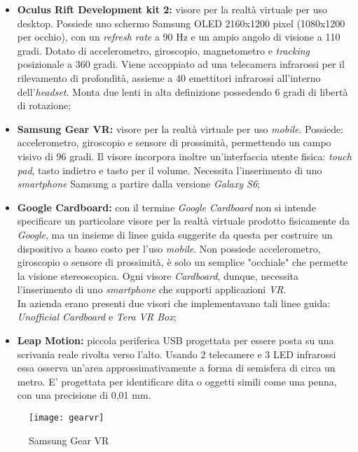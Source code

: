 \begin{itemize}
	\item \textbf{Oculus Rift Development kit 2:} visore per la realtà virtuale per uso desktop. Possiede uno schermo Samsung OLED 2160x1200 pixel (1080x1200 per occhio), con un \textit{refresh rate} a 90 Hz e un ampio angolo di visione a 110 gradi. Dotato di accelerometro, giroscopio, magnetometro e \textit{tracking} posizionale a 360 gradi. Viene accoppiato ad una telecamera infrarossi per il rilevamento di profondità, assieme a 40 emettitori infrarossi all'interno dell'\textit{headset}. Monta due lenti in alta definizione possedendo 6 gradi di libertà di rotazione;
	
	\item \textbf{Samsung Gear VR:} visore per la realtà virtuale per uso \textit{mobile}. Possiede: accelerometro, giroscopio e sensore di prossimità, permettendo un campo visivo di 96 gradi. Il visore incorpora inoltre un'interfaccia utente fisica: \textit{touch pad}, tasto indietro e tasto per il volume. Necessita l'inserimento di uno \textit{smartphone} Samsung a partire dalla versione \textit{Galaxy S6};
	
	\item \textbf{Google Cardboard:} con il termine \textit{Google Cardboard} non si intende specificare un particolare visore per la realtà virtuale prodotto fisicamente da \textit{Google}, ma un insieme di linee guida suggerite da questa per costruire un dispositivo a basso costo per l'uso \textit{mobile}. Non possiede accelerometro, giroscopio o sensore di prossimità, è solo un semplice "occhiale" che permette la visione stereoscopica. Ogni visore \textit{Cardboard}, dunque, necessita l'inserimento di uno \textit{smartphone} che supporti applicazioni \textit{VR}. \\ 
	In azienda erano presenti due visori che implementavano tali linee guida: \textit{Unofficial Cardboard} e \textit{Tera VR Box};
	
	\item \textbf{Leap Motion:} piccola periferica USB  progettata per essere posta su una scrivania reale rivolta verso l'alto. Usando 2 telecamere e 3 LED infrarossi essa osserva un'area approssimativamente a forma di semisfera di circa un metro. E' progettata per identificare dita o oggetti simili come una penna, con una precisione di 0,01 mm. 
\end{itemize}

\label{Gear VR}
\begin{figure}[ht]
	\begin{center}
		\texttt{[image: gearvr]}
		\caption{Samsung Gear VR}
	\end{center}
\end{figure}
\FloatBarrier

